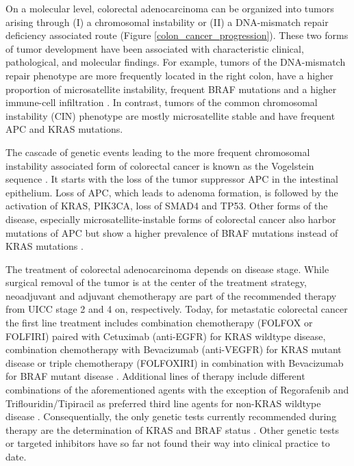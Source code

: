 \begin{flushleft}
On a molecular level, colorectal adenocarcinoma can be organized into tumors arising through (I) a chromosomal instability or (II) a DNA-mismatch repair deficiency associated route \cite{Markowitz2009} (Figure \ref{colon_cancer_progression}). These two forms of tumor development have been associated with characteristic clinical, pathological, and molecular findings. For example, tumors of the DNA-mismatch repair phenotype are more frequently located in the right colon, have a higher proportion of microsatellite instability, frequent BRAF mutations and a higher immune-cell infiltration \cite{Markowitz2009}. In contrast, tumors of the common chromosomal instability (CIN) phenotype are mostly microsatellite stable and have frequent APC and KRAS mutations. \par 

The cascade of genetic events leading to the more frequent chromosomal instability associated form of colorectal cancer is known as the Vogelstein sequence \cite{Cho1992}. It starts with the loss of the tumor suppressor APC in the intestinal epithelium. Loss of APC, which leads to adenoma formation, is followed by the activation of KRAS, PIK3CA, loss of SMAD4 and TP53. Other forms of the disease, especially microsatellite-instable forms of colorectal cancer also harbor mutations of APC but show a higher prevalence of BRAF mutations instead of KRAS mutations \cite{Guinney2015TheCancer.}. \par 

The treatment of colorectal adenocarcinoma depends on disease stage. While surgical removal of the tumor is at the center of the treatment strategy, neoadjuvant and adjuvant chemotherapy are part of the recommended therapy from UICC stage 2 and 4 on, respectively. Today, for metastatic colorectal cancer the first line treatment includes combination chemotherapy (FOLFOX or FOLFIRI) paired with Cetuximab (anti-EGFR) for KRAS wildtype disease, combination chemotherapy with Bevacizumab (anti-VEGFR) for KRAS mutant disease or triple chemotherapy (FOLFOXIRI) in combination with Bevacizumab for BRAF mutant disease \cite{Cutsem}. Additional lines of therapy include different combinations of the aforementioned agents with the exception of Regorafenib and Triflouridin/Tipiracil as preferred third line agents for non-KRAS wildtype disease \cite{Cutsem}. Consequentially, the only genetic tests currently recommended during therapy are the determination of KRAS and BRAF status \cite{Cutsem}. Other genetic tests or targeted inhibitors have so far not found their way into clinical practice to date.\par


\end{flushleft}

